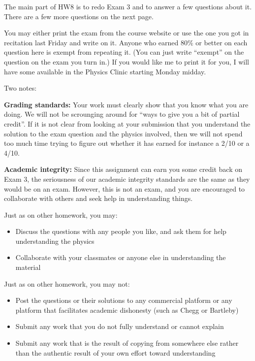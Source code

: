 \documentclass[12pt]{article}
\begin{document}
\Large
\centerline{}
\normalsize
\centerline{}

The main part of HW8 is to redo Exam 3 and to answer a few questions about it. There are a few more questions on the next page.

You may either print the exam from the course website or use the one you got in recitation last Friday and write on it. Anyone who earned 80\% or better on each question here is exempt from repeating it. (You can just write ``exempt'' on the question on the exam you turn in.) If you would like me to print it for you, I will have some available in the Physics Clinic starting Monday midday.

Two notes:

{\bf Grading standards:} Your work must clearly show that you know what you are doing. We will not be scrounging around for ``ways to give you a bit of partial credit''.
If it is not clear from looking at your submission that you understand the solution to the exam question and the physics involved, then we will not spend too much time
trying to figure out whether it has earned for instance a 2/10 or a 4/10.

{\bf Academic integrity:} Since this assignment can earn you some credit back on Exam 3, the seriousness of our academic integrity standards are the same as they would be on an exam. However, this is not an exam, and you are encouraged to collaborate with others and seek help in understanding things. 

Just as on other homework, you may:

\begin{itemize}
\item Discuss the questions with any people you like, and ask them for help understanding the physics
\item Collaborate with your classmates or anyone else in understanding the material
\end{itemize}

Just as on other homework, you may not:

\begin{itemize}
\item Post the questions or their solutions to any commercial platform or any platform that facilitates academic dishonesty (such as Chegg or Bartleby)
\item Submit any work that you do not fully understand or cannot explain
\item Submit any work that is the result of copying from somewhere else rather than the authentic result of your own effort toward understanding
\end{itemize}
\end{document}
